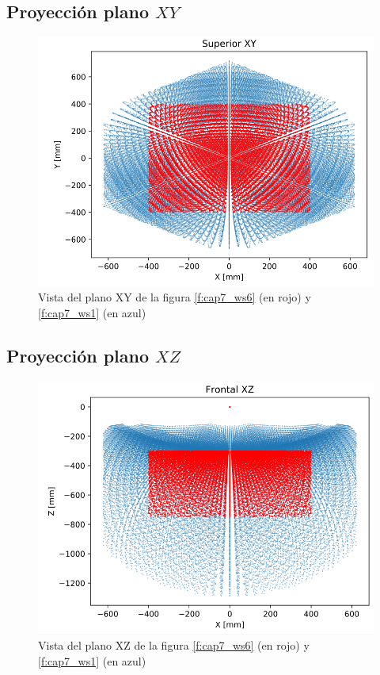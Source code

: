     \newpage

    
    \subsection{Proyección plano $XY$}
        \begin{figure}[h]
            \centering
            \includegraphics[width=0.6\linewidth]{Main/Chapter7/Images7/ws_2.png}
            \caption{Vista del plano XY de la figura \eqref{f:cap7_ws6} (en rojo) y \eqref{f:cap7_ws1} (en azul) }
            \label{f:cap7_ws2}
        \end{figure}  
    
    \subsection{Proyección plano $XZ$}
        \begin{figure}[h]
            \centering
            \includegraphics[width=0.6\linewidth]{Main/Chapter7/Images7/ws_3.png}
            \caption{Vista del plano XZ de la figura \eqref{f:cap7_ws6} (en rojo) y \eqref{f:cap7_ws1} (en azul) }
            \label{f:cap7_ws3}
        \end{figure}  
        
